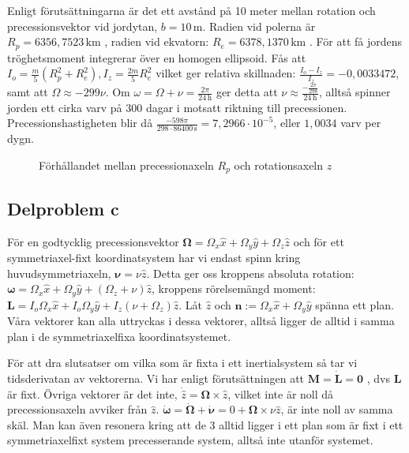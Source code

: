 \documentclass[12pt,a4paper]{article}
\begin{document}
	Enligt förutsättningarna är det ett avstånd på 10 meter mellan rotation och
	precessionsvektor vid jordytan, $b=10 \,\mathrm{m}$. Radien vid polerna är $R_p= 6356,7523 \,\mathrm{km}$ \footnotemark[1],
	radien vid ekvatorn: $R_e=6378,1370 \,\mathrm{km}$ \footnotemark[1]. För att få jordens tröghetsmoment integrerar över en homogen ellipsoid.
	Fås att $I_o = \frac{m}{5}(R_p^2+R_e^2), I_z = \frac{2m}{5}R_e^2$ vilket ger relativa
	skillnaden: $\frac{I_o-I_z}{I_z} = -0,0033472$, samt att $\Omega \approx -299\nu$. Om
	$\omega=\Omega+\nu = \frac{2\pi}{24 \,\mathrm{h}}$ ger detta att
	$\nu \approx \frac{-\frac{2\pi}{298}}{24 \,\mathrm{h}}$, alltså spinner jorden ett cirka varv på 300
	dagar i motsatt riktning till precessionen. Precessionshastigheten blir då $\frac{-598\pi}{298 \cdot 86400 \,\mathrm{s}} = 7,2966 \cdot 10^{-5}$, eller $1,0034$ varv per dygn.

	\begin{figure}
		\begin{center}
			
			\caption{Förhållandet mellan precessionaxeln $R_p$ och rotationsaxeln $z$}
                        \label{jorden}
		\end{center}
	\end{figure}

	\subsection{Delproblem c}
		För en godtycklig precessionsvektor $\boldsymbol{\Omega}= \Omega_x \hat{x} + \Omega_y \hat{y} + \Omega_z \hat{z}$
		och för ett symmetriaxel-fixt 
		koordinatsystem har vi endast spinn kring huvudsymmetriaxeln, $\boldsymbol{\nu}=\nu \hat{z}$.
		Detta ger oss kroppens absoluta rotation: 
		$\boldsymbol{\omega}=\Omega_x \hat{x} + \Omega_y \hat{y} + (\Omega_z + \nu )\hat{z}$, kroppens rörelsemängd moment: 
		$\mathbf{L}=I_o \Omega_x \hat{x} + I_o \Omega_y \hat{y} + I_z (\nu + \Omega_z) \hat{z}$.
		Låt $\hat{z}$ och $\mathbf{n} := \Omega_x \hat{x} + \Omega_y \hat{y}$ 
		spänna ett plan. Våra vektorer kan alla uttryckas i dessa vektorer, alltså ligger de alltid i samma plan i de symmetriaxelfixa koordinatsystemet. 
		
		
		För att dra slutsatser om vilka som är fixta i ett inertialsystem så tar vi tidsderivatan av
		vektorerna. Vi har enligt förutsättningen att $\mathbf{M} = \dot{\mathbf{L}} = \mathbf{0}$ ,
		dvs $\mathbf{L}$ är fixt. Övriga vektorer är det inte, $\dot{\hat{z}}=\boldsymbol{\Omega} \times \hat{z}$,
		vilket inte är noll då precessionsaxeln avviker från $\hat{z}$. $\dot{\boldsymbol{\omega}} = \dot{\boldsymbol{\Omega}}+\dot{\boldsymbol{\nu}} =
		0 + \boldsymbol{\Omega} \times \nu \hat{z}$, är inte noll av samma skäl.
		Man kan även resonera kring att de 3 alltid ligger i ett plan som är fixt i 
		ett symmetriaxelfixt system precesserande system, alltså inte utanför systemet.
		
\end{document}
